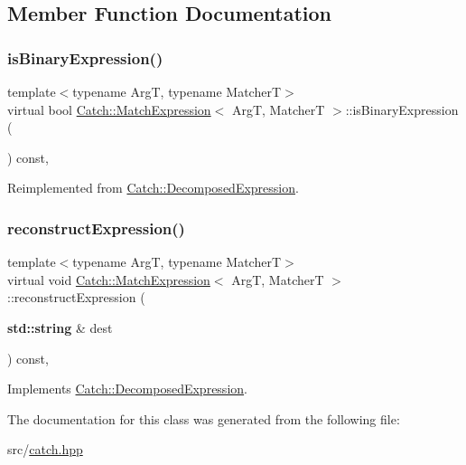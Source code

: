 \subsection{Member Function Documentation}
\mbox{\label{class_catch_1_1_match_expression_ac4edf6e9a6e5762a487db1486d0d1f45}} 
\subsubsection{\texorpdfstring{is\+Binary\+Expression()}{isBinaryExpression()}}
{\footnotesize\ttfamily template$<$typename ArgT, typename MatcherT$>$ \\
virtual bool \hyperlink{class_catch_1_1_match_expression}{Catch\+::\+Match\+Expression}$<$ ArgT, MatcherT $>$\+::is\+Binary\+Expression (\begin{DoxyParamCaption}{ }\end{DoxyParamCaption}) const\hspace{0.3cm}{\ttfamily [inline]}, {\ttfamily [virtual]}}



Reimplemented from \hyperlink{struct_catch_1_1_decomposed_expression_a1c458ece47b71f093290dbdf9bb31fdb}{Catch\+::\+Decomposed\+Expression}.

\mbox{\label{class_catch_1_1_match_expression_a4410a93bc5b8241eb2502f400fce7ec4}} 
\subsubsection{\texorpdfstring{reconstruct\+Expression()}{reconstructExpression()}}
{\footnotesize\ttfamily template$<$typename ArgT, typename MatcherT$>$ \\
virtual void \hyperlink{class_catch_1_1_match_expression}{Catch\+::\+Match\+Expression}$<$ ArgT, MatcherT $>$\+::reconstruct\+Expression (\begin{DoxyParamCaption}\item[{\textbf{ std\+::string} \&}]{dest }\end{DoxyParamCaption}) const\hspace{0.3cm}{\ttfamily [inline]}, {\ttfamily [virtual]}}



Implements \hyperlink{struct_catch_1_1_decomposed_expression_a9ce7f356dc96f11f80e40c82f5aa7e55}{Catch\+::\+Decomposed\+Expression}.



The documentation for this class was generated from the following file\+:\begin{DoxyCompactItemize}
\item 
src/\hyperlink{catch_8hpp}{catch.\+hpp}\end{DoxyCompactItemize}
